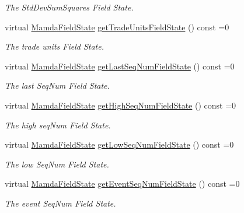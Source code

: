 \begin{CompactItemize}
\begin{CompactList}\small\item\em The Std\-Dev\-Sum\-Squares Field State. \item\end{CompactList}\item 
virtual \hyperlink{namespaceWombat_93aac974f2ab713554fd12a1fa3b7d2a}{Mamda\-Field\-State} \hyperlink{classWombat_1_1MamdaTradeRecap_76b2a0d55943b5bae38766f11bcc400e}{get\-Trade\-Units\-Field\-State} () const =0
\begin{CompactList}\small\item\em The trade units Field State. \item\end{CompactList}\item 
virtual \hyperlink{namespaceWombat_93aac974f2ab713554fd12a1fa3b7d2a}{Mamda\-Field\-State} \hyperlink{classWombat_1_1MamdaTradeRecap_97b6fab4e918ee8397fe7586b9d710c2}{get\-Last\-Seq\-Num\-Field\-State} () const =0
\begin{CompactList}\small\item\em The last Seq\-Num Field State. \item\end{CompactList}\item 
virtual \hyperlink{namespaceWombat_93aac974f2ab713554fd12a1fa3b7d2a}{Mamda\-Field\-State} \hyperlink{classWombat_1_1MamdaTradeRecap_6553b87e01893b7740590f0b079ca87f}{get\-High\-Seq\-Num\-Field\-State} () const =0
\begin{CompactList}\small\item\em The high seq\-Num Field State. \item\end{CompactList}\item 
virtual \hyperlink{namespaceWombat_93aac974f2ab713554fd12a1fa3b7d2a}{Mamda\-Field\-State} \hyperlink{classWombat_1_1MamdaTradeRecap_faa2d571451bc8a124a85a00e67f6fef}{get\-Low\-Seq\-Num\-Field\-State} () const =0
\begin{CompactList}\small\item\em The low Seq\-Num Field State. \item\end{CompactList}\item 
virtual \hyperlink{namespaceWombat_93aac974f2ab713554fd12a1fa3b7d2a}{Mamda\-Field\-State} \hyperlink{classWombat_1_1MamdaTradeRecap_13ffda2f1178cc9c6297b3624d0b9912}{get\-Event\-Seq\-Num\-Field\-State} () const =0
\begin{CompactList}\small\item\em The event Seq\-Num Field State. \item\end{CompactList}\item 

\end{CompactItemize}
